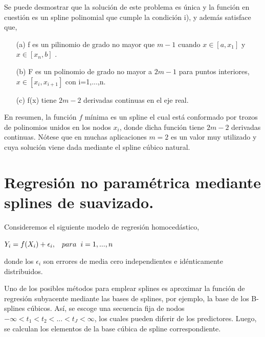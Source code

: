 \vspace{0.5cm}

\hspace{0.4cm} Se puede desmostrar que la soluci\'on de este problema es \'unica y la funci\'on en cuesti\'on es un spline polinomial que cumple la condici\'on i), y adem\'as satisface que,

\begin{itemize}
  \item[(a)] f es un pilinomio de grado no mayor que $m-1$ cuando $x \in [a,x_{1}]$ y $x \in [x_{n},b]$ .
  \item[(b)] F es un polinomio de grado no mayor a $2m-1$ para puntos interiores, $x \in [x_{i},x_{i+1}]$ con i=1,...,n.
  \item[(c)] f(x) tiene $2m-2$ derivadas continuas en el eje real.
\end{itemize}

\hspace{0.4cm} En resumen, la funci\'on $f$ m\'inima es un spline el cual est\'a conformado por trozos de polinomios unidos en los nodos $x_{i}$, donde dicha funci\'on tiene $2m-2$ derivadas continuas. N\'otese que en muchas aplicaciones $m=2$ es un valor muy utilizado y cuya soluci\'on viene dada mediante el spline c\'ubico natural.


\section{Regresi\'on no param\'etrica mediante splines de suavizado.}

\hspace{0.4cm} Consideremos el siguiente modelo de regresi\'on homoced\'astico,\\

\begin{center}

$\displaystyle{Y_{i}=f(X_{i})+\epsilon_{i}}, \hspace{0.3cm} para \hspace{0.2cm} i=1,...,n$
\end{center}

\vspace{0.5cm}

\noindent donde los $\epsilon_{i}$ son errores de media cero independientes e id\'enticamente distribuidos.

\vspace{0.5cm}

\hspace{0.4cm} Uno de los posibles m\'etodos para emplear splines es aproximar la funci\'on de regresi\'on subyacente mediante las bases de splines, por ejemplo, la base de los B-splines c\'ubicos. As\'i, se escoge una secuencia fija de nodos $-\infty<t_{1}<t_{2}<...<t_{J}<\infty$, los cuales pueden diferir de los predictores. Luego, se calculan los elementos de la base c\'ubica de spline correspondiente.

